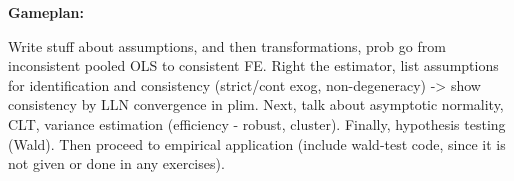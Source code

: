 




\textbf{Gameplan:}

Write stuff about assumptions, and then transformations, prob go from inconsistent pooled OLS to consistent FE. Right the estimator, list assumptions for identification and consistency (strict/cont exog, non-degeneracy) -> show consistency by LLN convergence in plim. Next, talk about asymptotic normality, CLT, variance estimation (efficiency - robust, cluster). Finally, hypothesis testing (Wald). Then proceed to empirical application (include wald-test code, since it is not given or done in any exercises). 

